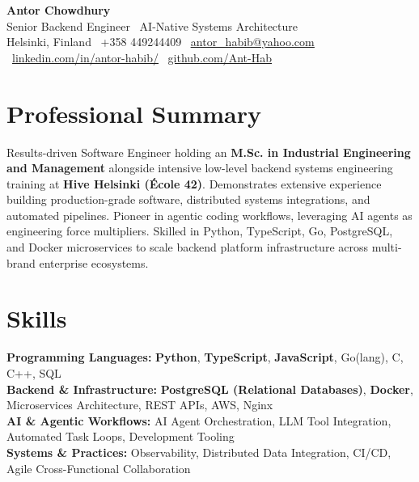 \documentclass[a4paper,11pt]{article}
\begin{document}
\vspace*{2pt}

\begin{center}
    {\Huge {}\selectfont \textbf{Antor Chowdhury}} \\[4pt]
    {\large {}\selectfont Senior Backend Engineer \textbar\ AI-Native Systems Architecture} \\[4pt]
    \small
    Helsinki, Finland \textbar\ +358 449244409 \textbar\ 
    \href{mailto:antor_habib@yahoo.com}{\underline{antor\_habib@yahoo.com}} \textbar\ 
    \href{https://www.linkedin.com/in/antor-habib/}{\underline{linkedin.com/in/antor-habib/}} \textbar\ 
    \href{https://github.com/Ant-Hab}{\underline{github.com/Ant-Hab}}
\end{center}

\vspace{-2pt}

\section{Professional Summary}
\begin{justify}
\small{
Results-driven Software Engineer holding an \textbf{M.Sc. in Industrial Engineering and Management} alongside intensive low-level backend systems engineering training at \textbf{Hive Helsinki (École 42)}. Demonstrates extensive experience building production-grade software, distributed systems integrations, and automated pipelines. Pioneer in agentic coding workflows, leveraging AI agents as engineering force multipliers. Skilled in Python, TypeScript, Go, PostgreSQL, and Docker microservices to scale backend platform infrastructure across multi-brand enterprise ecosystems.
}
\end{justify}

\vspace{-6pt}

\section{Skills}
\begin{itemize}[leftmargin=0.15in, label={}, itemsep=0pt, topsep=1pt]
\small{\item{
\textbf{Programming Languages:} \textbf{Python}, \textbf{TypeScript}, \textbf{JavaScript}, Go(lang), C, C++, SQL \\
\textbf{Backend \& Infrastructure:} \textbf{PostgreSQL (Relational Databases)}, \textbf{Docker}, Microservices Architecture, REST APIs, AWS, Nginx \\
\textbf{AI \& Agentic Workflows:} AI Agent Orchestration, LLM Tool Integration, Automated Task Loops, Development Tooling \\
\textbf{Systems \& Practices:} Observability, Distributed Data Integration, CI/CD, Agile Cross-Functional Collaboration
}}
\end{itemize}
\end{document}
